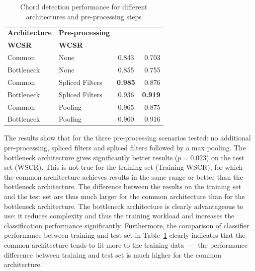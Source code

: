 \documentclass{article}
\begin{document}
\begin{table}
\centering
\begin{tabular*}{\columnwidth}{@{\extracolsep{\fill}}llcr}
\toprule
\textbf{Architecture}                   & \textbf{Pre-processing}                      & \begin{tabular}[c]{@{}c@{}}\textbf{Training}\\ \textbf{WCSR}\end{tabular} & \textbf{WCSR}  \\ \midrule
Common                         & None                                & 0.843                                                      & 0.703 \\
Bottleneck                     & None                                & 0.855                                                      & 0.755 \\
Common     & Spliced Filters & \textbf{0.985} & 0.876 \\
Bottleneck & Spliced Filters & 0.936 & \textbf{0.919} \\ 
Common & Pooling & 0.965 & 0.875 \\ 
Bottleneck & Pooling & 0.960 & 0.916 \\ \bottomrule
\end{tabular*}
\caption{Chord detection performance for different architectures and pre-processing steps}
\label{tab:arch}
\end{table}

The results show that for the three pre-processing scenarios tested: no additional pre-processing, spliced filters and spliced filters followed by a max pooling. The bottleneck architecture gives significantly better results ($p=0.023$) on the test set (WSCR). This is not true for the training set (Training WSCR), for which the common architecture achieves results in the same range or better than the bottleneck architecture. The difference between the results on the training set and the test set are thus much larger for the common architecture than for the bottleneck architecture.
The bottleneck architecture is clearly advantageous to use: it reduces complexity and thus the training workload and increases the classification performance significantly. Furthermore, the comparison of classifier performance between training and test set in Table~\ref{tab:arch} clearly indicates that the common architecture tends to fit more to the training data~---~the performance difference between training and test set is much higher for the common architecture.
\end{document}
